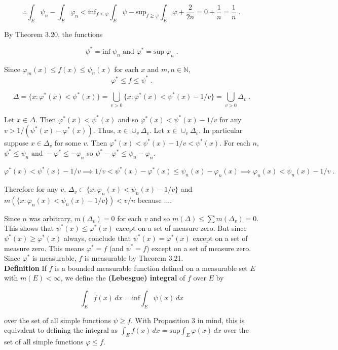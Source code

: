 \documentclass[a4paper]{article}
\begin{document}
$$\therefore \int_E \psi_n - \int_E \varphi_n < \text{inf}_{f\leq \psi} \int_E \psi - \text{sup}_{f\geq \varphi} \int_E \varphi  + \frac{2}{2n} = 0 + \frac{1}{n} = \frac{1}{n} \;.$$

By Theorem 3.20, the functions

$$\psi^* = \text{inf}\; \psi_n \text{ and } \varphi^* = \text{sup} \;\varphi_n \;.$$

Since $\varphi_m(x) \leq f(x) \leq \psi_n(x)$ for each $x$ and $m,n \in \mathbb{N}$, 
$$\varphi^* \leq f \leq \psi^* \;.$$

$$ \Delta = \{x : \varphi^*(x) < \psi^*(x) \} =  \bigcup_{v>0} \{x: \varphi^*(x) < \psi^*(x) - 1/v\} = \bigcup_{v>0} \Delta_v  \;.$$

Let $x \in \Delta$.  Then $\varphi^*(x) < \psi^*(x)$ and so $\varphi^*(x) < \psi^*(x) - 1/v$ for any $v > 1/(\psi^*(x) - \varphi^*(x))$. Thus, $x \in \cup_v \Delta_v$. Let $x \in \cup_v \Delta_v$. In particular suppose $x \in \Delta_v$ for some $v$. Then $\varphi^*(x) < \psi^*(x) - 1/v< \psi^*(x)$. For each $n$, $\psi^* \leq \psi_n \text{ and } -\varphi^* \leq -\varphi_n$ so $\psi^* - \varphi^* \leq \psi_n - \varphi_n$.  

$$\varphi^*(x) < \psi^*(x) - 1/v \implies 1/v < \psi^*(x) - \varphi^*(x) \leq \psi_n(x) - \varphi_n(x) \implies \varphi_n(x) < \psi_n(x) - 1/v \;.$$

Therefore for any $v$, $\Delta_v \subset \{x : \varphi_n(x) < \psi_n(x) - 1/v\}$ and $m(\{x : \varphi_n(x) < \psi_n(x) - 1/v\}) < v/n$ because ....

Since $n$ was arbitrary, $m(\Delta_v) = 0$ for each $v$ and so $m(\Delta) \leq \sum m(\Delta_v) = 0$. This shows that $\psi^*(x) \leq \varphi^*(x)$ except on a set of measure zero. But since $\psi^*(x) \geq \varphi^*(x)$ always, conclude that $\psi^*(x) = \varphi^*(x)$ except on a set of measure zero. This means $\varphi^* = f$ (and $\psi^* = f$) except on a set of measure zero. Since $\varphi^*$ is measurable, $f$ is measurable by Theorem 3.21. \\

{\bf Definition} If $f$ is a bounded measurable function defined on a measurable set $E$ with $m(E) < \infty$, we define the {\bf (Lebesgue) integral} of $f$ over $E$ by

$$\int_E f(x) \, dx = \text{inf} \int_E \psi(x) \, dx $$

over the set of all simple functions $\psi \geq f$. With Proposition 3 in mind, this is equivalent to defining the integral as $\int_E f(x) \, dx = \text{sup} \int_E \varphi(x) \, dx$ over the set of all simple functions $\varphi \leq f$. \\
\end{document}
